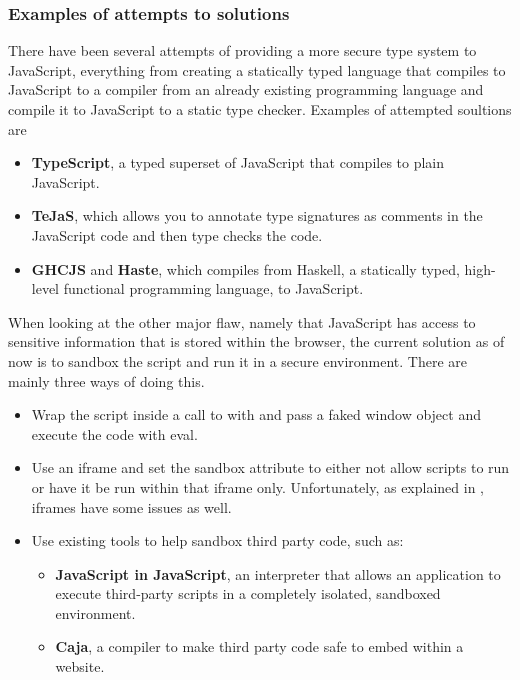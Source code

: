 \subsubsection{Examples of attempts to solutions}
There have been several attempts of providing a more secure type system to JavaScript, everything from creating a statically typed language that compiles to JavaScript to a compiler from an already existing programming language and compile it to JavaScript to a static type checker. Examples of attempted soultions are
\begin{itemize}
  \item \textbf{TypeScript}\cite{typescript}, a typed superset of JavaScript that compiles to plain JavaScript.
  \item \textbf{TeJaS}\cite{tejas-art,tejas-git}, which allows you to annotate type signatures as comments in the JavaScript code and then type checks the code.
  \item \textbf{GHCJS}\cite{ghcjs} and \textbf{Haste}\cite{haste-lang,haste-symposium}, which compiles from Haskell, a statically typed, high-level functional programming language\cite{haskell}, to JavaScript.
\end{itemize}

When looking at the other major flaw, namely that JavaScript has access to sensitive information that is stored within the browser, the current solution as of now is to sandbox the script and run it in a secure environment. There are mainly three ways of doing this.
\begin{itemize}
  \item Wrap the script inside a call to with and pass a faked window object and execute the code with eval.
  \item Use an iframe and set the sandbox attribute to either not allow scripts to run or have it be run within that iframe only. Unfortunately, as explained in \cite{js_in_js}, iframes have some issues as well.
  \item Use existing tools to help sandbox third party code, such as:
    \begin{itemize}
      \item \textbf{JavaScript in JavaScript}\cite{js_in_js}, an interpreter that allows an application to execute third-party scripts in a completely isolated, sandboxed environment.
      \item \textbf{Caja}\cite{caja_spec}, a compiler to make third party code safe to embed within a website.
    \end{itemize}
\end{itemize}
